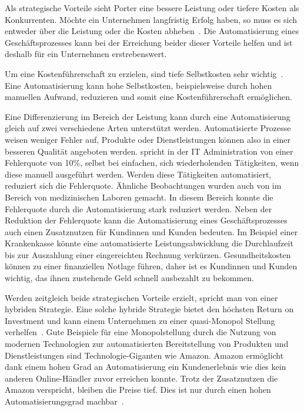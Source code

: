 Als strategische Vorteile sieht Porter eine bessere Leistung oder tiefere Kosten als Konkurrenten. Möchte ein Unternehmen langfristig Erfolg haben, so muss es sich entweder über die Leistung oder die Kosten abheben~\autocite{Capaul2010}. Die Automatisierung eines Geschäftsprozesses kann bei der Erreichung beider dieser Vorteile helfen und ist deshalb für ein Unternehmen erstrebenswert. 

Um eine Kostenführerschaft zu erzielen, sind tiefe Selbstkosten sehr wichtig~\autocite{Capaul2010}. Eine Automatisierung kann hohe Selbstkosten, beispielsweise durch hohen manuellen Aufwand, reduzieren und somit eine Kostenführerschaft ermöglichen.

Eine Differenzierung im Bereich der Leistung kann durch eine Automatisierung gleich auf zwei verschiedene Arten unterstützt werden. Automatisierte Prozesse weisen weniger Fehler auf, Produkte oder Dienstleistungen können also in einer besseren Qualität angeboten werden. \textcite{Kregassner2012} spricht in der IT Administration von einer Fehlerquote von 10\%, selbst bei einfachen, sich wiederholenden Tätigkeiten, wenn diese manuell ausgeführt werden. Werden diese Tätigkeiten automatisiert, reduziert sich die Fehlerquote. Ähnliche Beobachtungen wurden auch von \textcite{Uettwiller-Geiger2005} im Bereich von medizinischen Laboren gemacht. In diesem Bereich konnte die Fehlerquote durch die Automatisierung stark reduziert werden. Neben der Reduktion der Fehlerquote kann die Automatisierung eines Geschäftsprozesses auch einen Zusatznutzen für Kundinnen und Kunden bedeuten. Im Beispiel einer Krankenkasse könnte eine automatisierte Leistungsabwicklung die Durchlaufzeit bis zur Auszahlung einer eingereichten Rechnung verkürzen. Gesundheitskosten können zu einer finanziellen Notlage führen, daher ist es Kundinnen und Kunden wichtig, das ihnen zustehende Geld schnell ausbezahlt zu bekommen.

Werden zeitgleich beide strategischen Vorteile erzielt, spricht man von einer hybriden Strategie. Eine solche hybride Strategie bietet den höchsten Return on Investment und kann einem Unternehmen zu einer quasi-Monopol Stellung verhelfen~\autocite{Lombriser2010}. Gute Beispiele für eine Monopolstellung durch die Nutzung von modernen Technologien zur automatisierten Bereitstellung von Produkten und Dienstleistungen sind Technologie-Giganten wie Amazon. Amazon ermöglicht dank einem hohen Grad an Automatisierung ein Kundenerlebnis wie dies kein anderen Online-Händler zuvor erreichen konnte. Trotz der Zusatznutzen die Amazon verspricht, bleiben die Preise tief. Dies ist nur durch einen hohen Automatisierungsgrad machbar~\autocite{Kha2000}.

